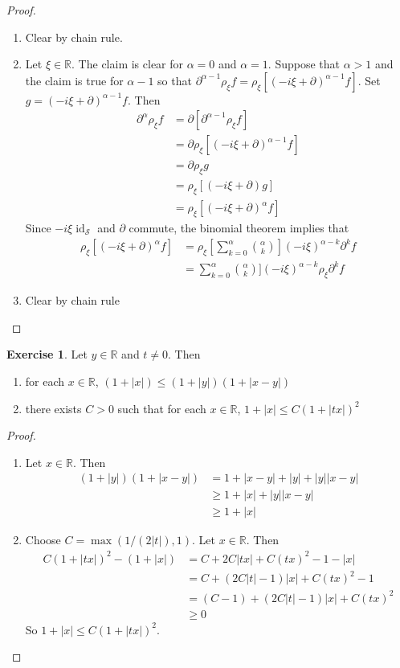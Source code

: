 \documentclass[12pt]{amsart}
\theoremstyle{definition}
\newtheorem{ex}[definition]{Exercise}
\newcommand{\p}{\partial}
\newcommand{\al}{\alpha}
\newcommand{\R}{\mathbb{R}}
\newcommand{\MS}{\mathcal{S}}
\DeclareMathOperator*{\id}{id}
\begin{document}
	\begin{proof}\
		\begin{enumerate}
			\item Clear by chain rule.
			\item Let $\xi \in \R$. The claim is clear for $\al = 0$ and $\al = 1$. Suppose that $\al >1$ and the claim is true for $\al-1$ so that
			$\p^{\al-1} \rho_{\xi} f =  \rho_{\xi} [(-i\xi + \p)^{\al-1}f]$. Set $g = (-i\xi + \p)^{\al-1}f$. Then 
			\begin{align*}
				\p^{\al} \rho_{\xi}f 
				& = \p [\p^{\al-1} \rho_{\xi} f ] \\
				& = \p \rho_{\xi} [(-i\xi + \p)^{\al-1}f] \\
				& = \p \rho_{\xi} g \\
				& = \rho_{\xi} [(-i\xi + \p)g] \\
				& = \rho_{\xi} [(-i\xi + \p)^{\al}f] 
			\end{align*}
		 	Since $-i \xi \id_{\MS}$ and $\p$ commute, the binomial theorem implies that 
		 	\begin{align*}
		 		\rho_{\xi}[(-i\xi + \p)^{\al}f] 
		 		& = \rho_{\xi}[\sum\limits_{k=0}^{\al} {\al \choose k}] (-i\xi)^{\al-k}\p^{k}f \\
		 		& = \sum\limits_{k=0}^{\al} {\al \choose k}] (-i\xi)^{\al-k}\rho_{\xi}\p^{k}f
		 	\end{align*}
	 		\item Clear by chain rule
		\end{enumerate}
	\end{proof}

	\begin{ex} Let $y \in \R$ and $t \neq 0$. Then
		\begin{enumerate}
			\item for each $x \in \R$,  $(1+|x|) \leq (1 + |y|)(1+ |x-y|)$
			\item there exists $C > 0$ such that for each $x \in \R$, $1+|x| \leq C(1 + |tx|)^2$ 
		\end{enumerate}
	\end{ex}
	
	\begin{proof}\
		\begin{enumerate}
			\item Let $x \in \R$. Then 
			\begin{align*}
				(1 + |y|)(1+ |x-y|) 
				& = 1 + |x-y| + |y| + |y||x-y| \\
				& \geq 1 + |x| + |y||x-y| \\
				& \geq 1 + |x| 
			\end{align*}
			\item Choose $C = \max(1/(2|t|), 1)$. Let $x \in \R$. Then 
			\begin{align*}
				C(1 + |tx|)^2 - (1 + |x|) 
				& = C + 2C|tx| + C(tx)^2 - 1 - |x| \\
				& = C + (2C|t| - 1)|x| + C(tx)^2 - 1 \\
				& = (C-1) + (2C|t| - 1)|x| + C(tx)^2 \\
				& \geq 0
			\end{align*}
			So $1 + |x| \leq C(1 + |tx|)^2$. 
		\end{enumerate}
	\end{proof}
\end{document}
